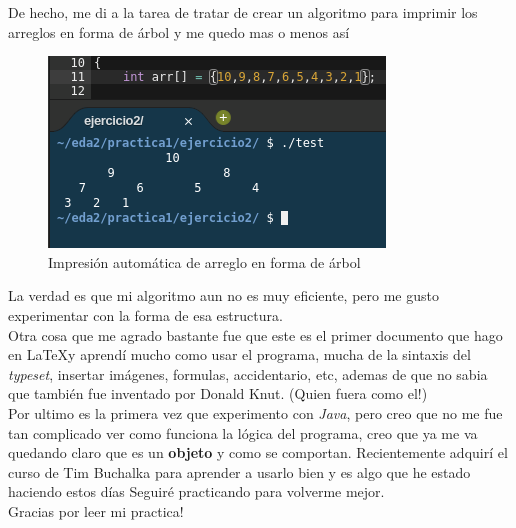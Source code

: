 \documentclass{article}
\begin{document}
	De hecho, me di a la tarea de tratar de crear un algoritmo para imprimir los arreglos en forma de árbol y me quedo mas o menos así
	
	\begin{figure}[H]
		\centering
		\includegraphics[scale = 0.8]{images/test}
		\caption{Impresión automática de arreglo en forma de árbol}
	\end{figure}
	
	La verdad es que mi algoritmo aun no es muy eficiente, pero me gusto experimentar con la forma de esa estructura.\\
	
	Otra cosa que me agrado bastante fue que este es el primer documento que hago en \LaTeX y aprendí mucho como usar el programa, mucha de la sintaxis del \emph{typeset}, insertar imágenes, formulas, accidentario, etc, ademas de que no sabia que también fue inventado por Donald Knut. (Quien fuera como el!)\\
	
	Por ultimo es la primera vez que experimento con \emph{Java}, pero creo que no me fue tan complicado ver como funciona la lógica del programa, creo que ya me va quedando claro que es un \textbf{objeto} y como se comportan. Recientemente adquirí el curso de Tim Buchalka para aprender a usarlo bien y es algo que he estado haciendo estos días Seguiré practicando para volverme mejor.\\
	
	Gracias por leer mi practica! 
	
\end{document}
